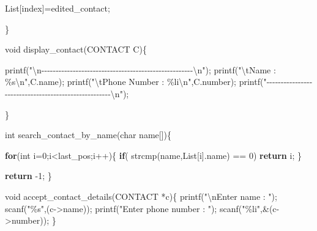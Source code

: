\documentclass[
]{article}
\newenvironment{Shaded}{}{}
\newcommand{\ControlFlowTok}[1]{\textcolor[rgb]{0.00,0.44,0.13}{\textbf{#1}}}
\newcommand{\DataTypeTok}[1]{\textcolor[rgb]{0.56,0.13,0.00}{#1}}
\newcommand{\DecValTok}[1]{\textcolor[rgb]{0.25,0.63,0.44}{#1}}
\newcommand{\NormalTok}[1]{#1}
\newcommand{\OperatorTok}[1]{\textcolor[rgb]{0.40,0.40,0.40}{#1}}
\newcommand{\SpecialCharTok}[1]{\textcolor[rgb]{0.25,0.44,0.63}{#1}}
\newcommand{\StringTok}[1]{\textcolor[rgb]{0.25,0.44,0.63}{#1}}
\begin{document}
\begin{Shaded}
\begin{Highlighting}[]
\NormalTok{    List}\OperatorTok{[}\NormalTok{index}\OperatorTok{]=}\NormalTok{edited\_contact}\OperatorTok{;}

\OperatorTok{\}}

\DataTypeTok{void}\NormalTok{ display\_contact}\OperatorTok{(}\NormalTok{CONTACT C}\OperatorTok{)\{}

\NormalTok{    printf}\OperatorTok{(}\StringTok{"}\SpecialCharTok{\textbackslash{}n}\StringTok{{-}{-}{-}{-}{-}{-}{-}{-}{-}{-}{-}{-}{-}{-}{-}{-}{-}{-}{-}{-}{-}{-}{-}{-}{-}{-}{-}{-}{-}{-}{-}{-}{-}{-}{-}{-}{-}{-}{-}{-}{-}{-}{-}{-}{-}{-}{-}{-}{-}{-}{-}{-}{-}}\SpecialCharTok{\textbackslash{}n}\StringTok{"}\OperatorTok{);}
\NormalTok{    printf}\OperatorTok{(}\StringTok{"}\SpecialCharTok{\textbackslash{}t}\StringTok{Name         : \%s}\SpecialCharTok{\textbackslash{}n}\StringTok{"}\OperatorTok{,}\NormalTok{C}\OperatorTok{.}\NormalTok{name}\OperatorTok{);}
\NormalTok{    printf}\OperatorTok{(}\StringTok{"}\SpecialCharTok{\textbackslash{}t}\StringTok{Phone Number : \%li}\SpecialCharTok{\textbackslash{}n}\StringTok{"}\OperatorTok{,}\NormalTok{C}\OperatorTok{.}\NormalTok{number}\OperatorTok{);}
\NormalTok{    printf}\OperatorTok{(}\StringTok{"{-}{-}{-}{-}{-}{-}{-}{-}{-}{-}{-}{-}{-}{-}{-}{-}{-}{-}{-}{-}{-}{-}{-}{-}{-}{-}{-}{-}{-}{-}{-}{-}{-}{-}{-}{-}{-}{-}{-}{-}{-}{-}{-}{-}{-}{-}{-}{-}{-}{-}{-}{-}{-}}\SpecialCharTok{\textbackslash{}n}\StringTok{"}\OperatorTok{);}

\OperatorTok{\}}


\DataTypeTok{int}\NormalTok{ search\_contact\_by\_name}\OperatorTok{(}\DataTypeTok{char}\NormalTok{ name}\OperatorTok{[])\{}

    \ControlFlowTok{for}\OperatorTok{(}\DataTypeTok{int}\NormalTok{ i}\OperatorTok{=}\DecValTok{0}\OperatorTok{;}\NormalTok{i}\OperatorTok{\textless{}}\NormalTok{last\_pos}\OperatorTok{;}\NormalTok{i}\OperatorTok{++)\{}
        \ControlFlowTok{if}\OperatorTok{(}\NormalTok{ strcmp}\OperatorTok{(}\NormalTok{name}\OperatorTok{,}\NormalTok{List}\OperatorTok{[}\NormalTok{i}\OperatorTok{].}\NormalTok{name}\OperatorTok{)} \OperatorTok{==} \DecValTok{0}\OperatorTok{)}
            \ControlFlowTok{return}\NormalTok{ i}\OperatorTok{;}
    \OperatorTok{\}}

    \ControlFlowTok{return} \OperatorTok{{-}}\DecValTok{1}\OperatorTok{;}
\OperatorTok{\}}

\DataTypeTok{void}\NormalTok{ accept\_contact\_details}\OperatorTok{(}\NormalTok{CONTACT }\OperatorTok{*}\NormalTok{c}\OperatorTok{)\{}
\NormalTok{    printf}\OperatorTok{(}\StringTok{"}\SpecialCharTok{\textbackslash{}n}\StringTok{Enter name : "}\OperatorTok{);}
\NormalTok{    scanf}\OperatorTok{(}\StringTok{"\%s"}\OperatorTok{,(}\NormalTok{c}\OperatorTok{{-}\textgreater{}}\NormalTok{name}\OperatorTok{));}
\NormalTok{    printf}\OperatorTok{(}\StringTok{"Enter phone number : "}\OperatorTok{);}
\NormalTok{    scanf}\OperatorTok{(}\StringTok{"\%li"}\OperatorTok{,\&(}\NormalTok{c}\OperatorTok{{-}\textgreater{}}\NormalTok{number}\OperatorTok{));}
\OperatorTok{\}}


\end{Highlighting}
\end{Shaded}
\end{document}
